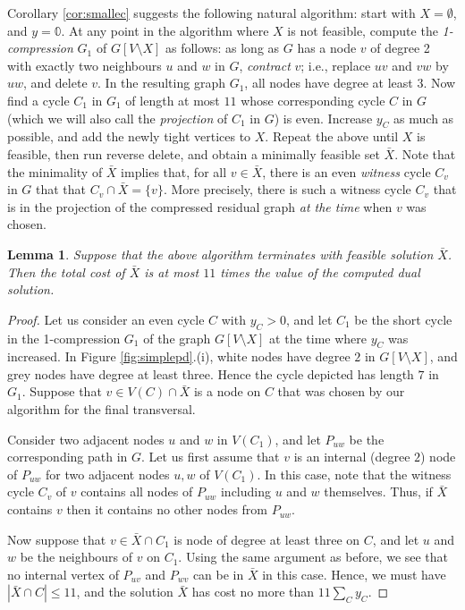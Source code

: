 \documentclass{article}
\newcommand{\0}{\mathbb{0}}
\newcommand{\1}{\mathbb{1}}
\newtheorem{lemma}[theorem]{Lemma}
\begin{document}
Corollary \ref{cor:smallec} suggests the following natural algorithm:
start with $X=\emptyset$, and $y=\0$. At any point in the algorithm
where $X$ is not feasible, compute the {\em 1-compression} $G_1$ of
$G[V\setminus X]$ as follows: as long as $G$ has a node $v$ of degree 2 with
exactly two neighbours $u$ and $w$ in $G$, {\em contract} $v$; i.e.,
replace $uv$ and $vw$ by $uw$, and delete $v$. In the resulting graph
$G_1$, all nodes have degree at least $3$. Now find a cycle $C_1$ in
$G_1$ of length at most $11$ whose corresponding cycle $C$ in $G$
(which we will also call the {\em projection} of $C_1$ in $G$)
is
even. Increase $y_C$ as much as possible, and add the newly tight
vertices to $X$. Repeat the above until $X$ is feasible, then run
reverse delete, and obtain a minimally feasible set $\bar{X}$. Note
that the minimality of $\bar{X}$ implies that, for all
$v \in \bar{X}$, there is an even {\em witness} cycle $C_v$ in $G$
that that $C_v \cap \bar{X} = \{v\}$. More precisely,  there is such a
witness cycle $C_v$ that is in the projection of  the compressed
residual graph {\em at the time} when $v$ was chosen. 

\begin{lemma} \label{lem:simplealg}
  Suppose that the above algorithm terminates with
  feasible solution $\bar{X}$. Then the total cost of $\bar{X}$ is at
  most $11$ times the value of the computed dual solution.
\end{lemma}
\begin{proof}
  Let us consider an even cycle $C$ with $y_C>0$, and let $C_1$ be the
  short cycle in the 1-compression $G_1$ of the graph $G[V\setminus
  X]$ at the time where $y_C$ was increased. 
  In Figure
  \ref{fig:simplepd}.(i), white nodes have degree $2$ in $G[V\setminus
  X]$, and grey nodes have degree at least three. Hence the cycle
  depicted has length $7$ in $G_1$. Suppose that $v \in V(C) \cap
  \bar{X}$ is a node on $C$ that was chosen by our algorithm for the
  final transversal.

  Consider two adjacent nodes $u$ and $w$ in $V(C_1)$, and let
  $P_{uw}$ be the corresponding path in $G$. 
  Let us first assume that $v$ is an internal (degree $2$) node of
  $P_{uw}$ for two adjacent nodes $u,w$ of $V(C_1)$. In this case,
  note that the witness cycle $C_v$ of $v$ contains all nodes of
  $P_{uw}$ including $u$ and $w$ themselves. Thus, if $\bar{X}$
  contains $v$ then it contains no other nodes from $P_{uw}$.

  Now suppose that $v \in \bar{X} \cap C_1$ is node of
  degree at least three on $C$, and let $u$ and $w$ be the neighbours
  of $v$ on $C_1$. Using the same argument as before, we see that
  no internal vertex of $P_{uv}$ and $P_{wv}$ can be in $\bar{X}$ in
  this case. Hence, we must have
  $|\bar{X} \cap C| \leq 11$, and the solution
  $\bar{X}$ has cost no more than $11\sum_Cy_C$. 
\end{proof}
\end{document}
